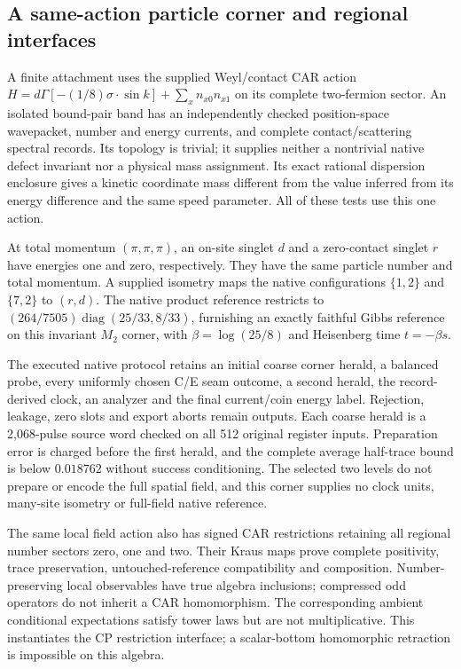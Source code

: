 \subsection{A same-action particle corner and regional interfaces}
\label{subsec:same-action-finite-interfaces}

A finite attachment uses the supplied Weyl/contact CAR action
$H=d\Gamma[-(1/8)\sigma\cdot\sin k]+\sum_x n_{x0}n_{x1}$ on its
complete two-fermion sector. An isolated bound-pair band has an independently
checked position-space wavepacket, number and energy currents, and complete
contact/scattering spectral records. Its topology is trivial; it supplies
neither a nontrivial native defect invariant nor a physical mass assignment.
Its exact rational dispersion enclosure gives a kinetic coordinate mass
different from the value inferred from its energy difference and the same
speed parameter. All of these tests use this one action.

At total momentum $(\pi,\pi,\pi)$, an on-site singlet $d$ and a
zero-contact singlet $r$ have energies one and zero, respectively. They
have the same particle number and total momentum. A supplied isometry
maps the native configurations $\{1,2\}$ and $\{7,2\}$ to $(r,d)$.
The native product reference restricts to
$(264/7505)\operatorname{diag}(25/33,8/33)$, furnishing an exactly
faithful Gibbs reference on this invariant $M_2$ corner, with
$\beta=\log(25/8)$ and Heisenberg time $t=-\beta s$.

The executed native protocol retains an initial coarse corner herald,
a balanced probe, every uniformly chosen C/E seam outcome, a second
herald, the record-derived clock, an analyzer and the final current/coin
energy label. Rejection, leakage, zero slots and export aborts remain
outputs. Each coarse herald is a 2,068-pulse source word checked on all
512 original register inputs. Preparation error is charged before the
first herald, and the complete average half-trace bound is below
$0.018762$ without success conditioning. The selected two levels do not
prepare or encode the full spatial field, and this corner supplies no clock
units, many-site isometry or full-field native reference.

The same local field action also has signed CAR restrictions retaining
all regional number sectors zero, one and two. Their Kraus maps prove
complete positivity, trace preservation, untouched-reference compatibility
and composition. Number-preserving local observables have true algebra
inclusions; compressed odd operators do not inherit a CAR homomorphism.
The corresponding ambient conditional expectations satisfy tower laws
but are not multiplicative. This instantiates the CP restriction interface;
a scalar-bottom homomorphic retraction is impossible on this algebra.

